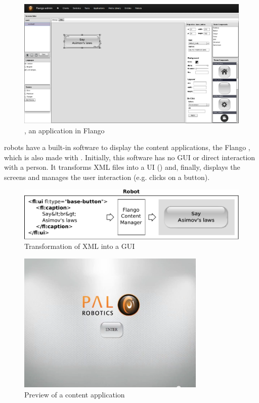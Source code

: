 \begin{figure}[htb]
    \centering
    \includegraphics[width=\textwidth]{figures/screens-editor}
    \caption{\se , an \flash application in Flango}
    \label{fig:screens-editor}
\end{figure}

 robots have a built-in software to display the content applications, the Flango \cm , which is also made with \flash .
Initially, this software has no \ac{GUI} or direct interaction with a person.
It transforms \ac{XML} files into a \ac{UI} () and, finally, displays the screens and manages the user interaction (e.g. clicks on a button).

\begin{figure}[htb]
    \centering
    \includegraphics[width=\textwidth]{figures/xml-flango-screenshot}
    \caption{Transformation of \acs{XML} into a \acs{GUI}}
    \label{fig:xml-flango-view}
\end{figure}

\begin{figure}[htb]
    \centering
    \includegraphics[width=0.8\textwidth]{figures/demo-app-preview}
    \caption{Preview of a content application}
    \label{fig:demo-app-preview}
\end{figure}

